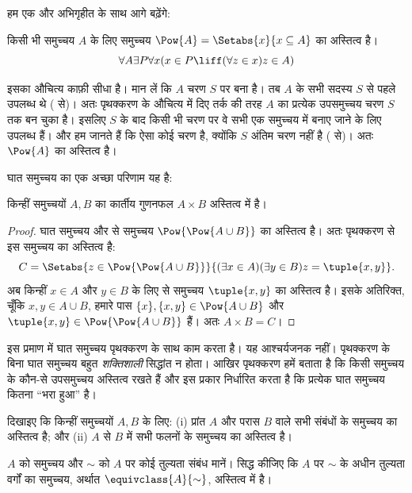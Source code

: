 \documentclass[../../../include/open-logic-section]{subfiles}
\begin{document}

हम एक और अभिगृहीत के साथ आगे बढ़ेंगे:

\begin{axiom}[घात समुच्चय]
किसी भी समुच्चय $A$ के लिए समुच्चय
$\Pow{A} = \Setabs{x}{x \subseteq A}$ का अस्तित्व है।
\[
	\forall A \exists P \forall x(x \in P \liff (\forall z \in x)z \in A)
\]
\end{axiom}

इसका औचित्य काफ़ी सीधा है। मान लें कि $A$ चरण $S$ पर बना है। तब $A$ के
सभी सदस्य $S$ से पहले उपलब्ध थे (\stagesacc{} से)। अतः पृथक्करण के औचित्य
में दिए तर्क की तरह $A$ का प्रत्येक उपसमुच्चय चरण $S$ तक बन चुका है। इसलिए
$S$ के बाद किसी भी चरण पर वे सभी एक समुच्चय में बनाए जाने के लिए उपलब्ध हैं।
और हम जानते हैं कि ऐसा कोई चरण है, क्योंकि $S$ अंतिम चरण नहीं है
(\stagessucc{} से)। अतः $\Pow{A}$ का अस्तित्व है।

घात समुच्चय का एक अच्छा परिणाम यह है:

\begin{prop}\label{thm:Products}
किन्हीं समुच्चयों $A, B$ का कार्तीय गुणनफल $A \times B$ अस्तित्व में है।
\end{prop}

\begin{proof}
घात समुच्चय और  से समुच्चय
$\Pow{\Pow{A \cup B}}$ का अस्तित्व है। अतः पृथक्करण से इस समुच्चय का
अस्तित्व है:
\[
	C = \Setabs{z \in \Pow{\Pow{A \cup B}}}{(\exists x \in A)(\exists y \in B) z = \tuple{x, y}}.
\]
अब किन्हीं $x \in A$ और $y \in B$ के लिए
 से समुच्चय $\tuple{x, y}$
का अस्तित्व है। इसके अतिरिक्त, चूँकि $x, y \in A \cup B$, हमारे पास
$\{x\}, \{x, y\} \in \Pow{A \cup B}$ और
$\tuple{x,y} \in \Pow{\Pow{A \cup B}}$ हैं। अतः $A \times B = C$।
\end{proof}

इस प्रमाण में घात समुच्चय पृथक्करण के साथ काम करता है। यह आश्चर्यजनक नहीं।
पृथक्करण के बिना घात समुच्चय बहुत \emph{शक्तिशाली} सिद्धांत न होता। आखिर
पृथक्करण हमें बताता है कि किसी समुच्चय के कौन-से उपसमुच्चय अस्तित्व रखते हैं
और इस प्रकार निर्धारित करता है कि प्रत्येक घात समुच्चय कितना ``भरा हुआ'' है।

\begin{prob}
दिखाइए कि किन्हीं समुच्चयों $A, B$ के लिए: (i) प्रांत $A$ और परास $B$
वाले सभी संबंधों के समुच्चय का अस्तित्व है; और (ii) $A$ से $B$ में सभी
फलनों के समुच्चय का अस्तित्व है।
\end{prob}

\begin{prob}
$A$ को समुच्चय और $\sim$ को $A$ पर कोई तुल्यता संबंध मानें। सिद्ध कीजिए कि
$A$ पर $\sim$ के अधीन तुल्यता वर्गों का समुच्चय, अर्थात
$\equivclass{A}{\sim}$, अस्तित्व में है।
\end{prob}
\end{document}
